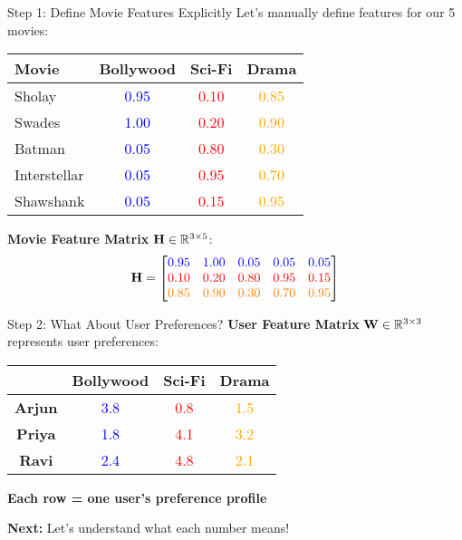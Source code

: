 \documentclass{beamer}
\begin{document}
\begin{frame}{Step 1: Define Movie Features Explicitly}
Let's manually define features for our 5 movies:

\pause
\begin{center}
\renewcommand{\arraystretch}{1.3}
\begin{tabular}{l|ccc}
\toprule
\textbf{Movie} & \textbf{Bollywood} & \textbf{Sci-Fi} & \textbf{Drama} \\
\midrule
Sholay & \textcolor{blue}{0.95} & \textcolor{red}{0.10} & \textcolor{orange}{0.85} \\
Swades & \textcolor{blue}{1.00} & \textcolor{red}{0.20} & \textcolor{orange}{0.90} \\
Batman & \textcolor{blue}{0.05} & \textcolor{red}{0.80} & \textcolor{orange}{0.30} \\
Interstellar & \textcolor{blue}{0.05} & \textcolor{red}{0.95} & \textcolor{orange}{0.70} \\
Shawshank & \textcolor{blue}{0.05} & \textcolor{red}{0.15} & \textcolor{orange}{0.95} \\
\bottomrule
\end{tabular}
\end{center}

\pause
\textbf{Movie Feature Matrix} $\mathbf{H} \in \mathbb{R}^{3 \times 5}$:
\begin{equation*}
\mathbf{H} = \begin{bmatrix}
\textcolor{blue}{0.95} & \textcolor{blue}{1.00} & \textcolor{blue}{0.05} & \textcolor{blue}{0.05} & \textcolor{blue}{0.05} \\
\textcolor{red}{0.10} & \textcolor{red}{0.20} & \textcolor{red}{0.80} & \textcolor{red}{0.95} & \textcolor{red}{0.15} \\
\textcolor{orange}{0.85} & \textcolor{orange}{0.90} & \textcolor{orange}{0.30} & \textcolor{orange}{0.70} & \textcolor{orange}{0.95}
\end{bmatrix}
\end{equation*}
\end{frame}

\begin{frame}{Step 2: What About User Preferences?}
\textbf{User Feature Matrix} $\mathbf{W} \in \mathbb{R}^{3 \times 3}$ represents user preferences:

\pause
\begin{center}
\renewcommand{\arraystretch}{1.4}
\begin{tabular}{c|ccc}
 & \textbf{Bollywood} & \textbf{Sci-Fi} & \textbf{Drama} \\
\hline
\textbf{Arjun} & \textcolor{blue}{3.8} & \textcolor{red}{0.8} & \textcolor{orange}{1.5} \\
\textbf{Priya} & \textcolor{blue}{1.8} & \textcolor{red}{4.1} & \textcolor{orange}{3.2} \\
\textbf{Ravi} & \textcolor{blue}{2.4} & \textcolor{red}{4.8} & \textcolor{orange}{2.1}
\end{tabular}
\end{center}

\pause
\textbf{Each row = one user's preference profile}

\pause
\textbf{Next:} Let's understand what each number means!
\end{frame}
\end{document}
